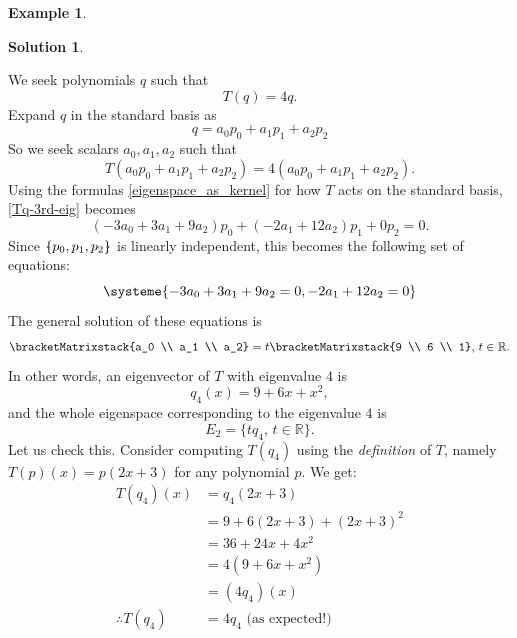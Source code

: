 \documentclass[a4paper,11pt]{book}
\theoremstyle{definition}
\newtheorem{example_environment}{Example}[chapter]
\newtheorem*{solution}{Solution}
\newcommand{\cmatrix}[1]{\bracketMatrixstack{#1}}
\newenvironment{example}
	{
		\begin{oframed} 
		\begin{example_environment}
	}
	{
		\end{example_environment}
		\end{oframed}
	}
\newcommand{\bmark}{\raisebox{.53ex}{\rule{.2em}{.1ex}}}
\newcommand{\bopen}{{\protect\ooalign{\{\cr\hfil\bmark\hfil\cr}}}
\newcommand{\bclose}{{\protect\ooalign{\}\cr\hfil\bmark\hfil\cr}}}
\begin{document}
\begin{example}
\begin{solution}
\begin{itemize}
We seek polynomials $q$ such that
\[
T(q) = 4q.
\]
Expand $q$ in the standard basis as
\[
 q = a_0 p_0 + a_1 p_1 + a_2 p_2
\]
So we seek scalars $a_0, a_1, a_2$ such that
\begin{equation}
 T(a_0 p_0 + a_1 p_1 + a_2 p_2) = 4 (a_0 p_0 + a_1 p_1 + a_2 p_2). \label{Tq-3rd-eig}
\end{equation}
Using the formulas \eqref{eigenspace_as_kernel} for how $T$ acts on the standard basis, \eqref{Tq-3rd-eig} becomes
\[
 (-3a_0 + 3a_1 + 9a_2) p_0 + (-2 a_1 + 12 a_2) p_1 + 0 p_2 = 0.
\]
Since $\bopen p_0, p_1, p_2 \bclose$ is linearly independent, this becomes the following set of equations:
\begin{equation} \label{eqns-eig-T-internal-2}
\systeme{-3a_0 + 3a_1 + 9a_2 = 0, -2a_1 + 12 a_2 = 0}
\end{equation}
The general solution of these equations is
\[
  \cmatrix{a_0 \\ a_1 \\ a_2} = t \cmatrix{9 \\ 6 \\ 1}, \, t \in \mathbb{R}.
\]
In other words, an eigenvector of $T$ with eigenvalue $4$ is
\[
q_4(x) = 9 + 6x + x^2,
\]
and the whole eigenspace corresponding to the eigenvalue $4$ is
\[
 E_2 = \{ t q_4, \, t \in \mathbb{R} \}.
\]
Let us check this. Consider computing $T(q_4)$ using the {\em definition} of $T$, namely $T(p)(x) = p(2x + 3)$ for any polynomial $p$. We get:
\begin{align*}
  T(q_4)(x) &= q_4(2x+3) \\
   &= 9 + 6(2x + 3) + (2x+3)^2 \\
   &= 36 + 24x + 4x^2 \\
   &= 4(9 + 6x + x^2) \\
   &= (4q_4)(x) \\
  \therefore T(q_4) &= 4q_4 \mbox{ (as expected!)}
\end{align*}

\end{itemize}

\end{solution}
\end{example}
\end{document}
